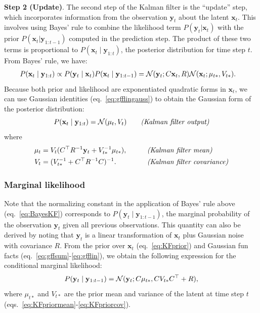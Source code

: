 \documentclass[10pt]{article}
\newcommand{\vx}{\mathbf{x}}
\newcommand{\vy}{\mathbf{y}}
\begin{document}
{\bf Step 2 (Update)}.  The second step of the Kalman filter is the
``update'' step, which incorporates information from the observation
$\vy_t$ about the latent $\vx_t$.  This involves using Bayes' rule to
combine the likelihood term $P(\vy_t | \vx_t)$ with the prior
$P(\vx_t | \vy_{1:{t-1}})$ computed in the prediction step. The
product of these two terms is proportional to
$P(\vx_t \mid \vy_{1:t})$, the posterior distribution for time step
$t$. From Bayes' rule, we have:
\begin{alignat}{2}
  P(\vx_{t}\mid \vy_{1:t}) & \propto  P(\vy_{t}\mid \vx_{t}) 
P(\vx_{t}\mid \vy_{1:t-1})
 = \Nrm(\vy_{t};
 C\vx_{t},R) \Nrm(\vx_{t}; \mu_{t*}, V_{t*}).
   \label{eq:BayesKF} 
 \end{alignat}
 Because both prior and likelihood are exponentiated quadratic forms in
 $\vx_t$, we can use Gaussian identities (eq.~\ref{eq:gfflingauss}) to
 obtain the Gaussian form of the posterior distribution:
\begin{equation}
P(\vx_{t}\mid \vy_{1:t}) = 
\Nrm(\mu_{t}, V_{t})
\qquad \text{\it(Kalman filter output)}
  \label{eq:KF}
\end{equation}
where
\begin{alignat}{2}
  \mu_{t} &= V_{t}(C\trp R\inv \vy_{t} + V_{t*}\inv \mu_{t*}),
 \qquad & &  \text{\it (Kalman filter mean)}  \label{eq:KFmean} 
 \\ 
V_{t} &= (V_{t*}\inv + C\trp R\inv C)\inv.
& & \text{\it (Kalman filter covariance)} 
\label{eq:KFcov} 
\end{alignat}


\subsubsection*{Marginal likelihood}
Note that the normalizing constant in the application of Bayes' rule
above (eq.~\ref{eq:BayesKF}) corresponds to
$P(\vy_t \mid \vy_{1:t-1})$, the marginal probability of the
observation $\vy_t$ given all previous observations.  This quantity
can also be derived by noting that $\vy_t$ is a linear transformation
of $\vx_t$ plus Gaussian noise with covariance $R$.  From the prior
over $\vx_t$ (eq.~\ref{eq:KFprior}) and Gaussian fun facts
(eq.~\ref{eq:gffsum}-\ref{eq:gfflin}), we obtain the following expression
for the conditional marginal likelihood:
\begin{equation}
  \label{eq:margliterms}
P(\vy_t \mid \vy_{1:t-1}) = \Nrm(\vy_t; C\mu_{t*}, CV_{t*}C\trp + R), 
\end{equation}
where $\mu_{t*}$ and $V_{t*}$ are the prior mean and variance of the
latent at time step $t$ (eqs.~\ref{eq:KFpriormean}-\ref{eq:KFpriorcov}).
\end{document}
